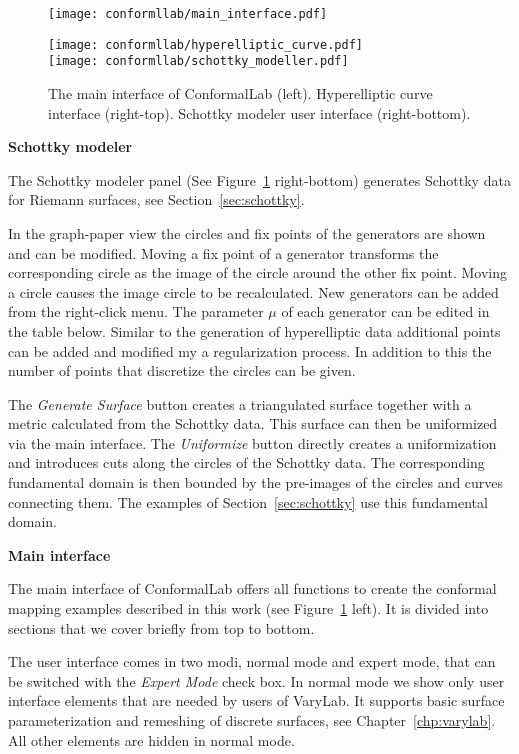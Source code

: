 \documentclass[Thesis.tex]{subfiles}
\begin{document}
\begin{figure}
\centering
\texttt{[image: conformllab/main\_interface.pdf]}\hfill
\begin{minipage}[b]{0.5\linewidth}
\texttt{[image: conformllab/hyperelliptic\_curve.pdf]}\\
\vskip 0.1cm
\texttt{[image: conformllab/schottky\_modeller.pdf]}
\end{minipage}
\caption{The main interface of {\sc ConformalLab} (left). Hyperelliptic curve interface (right-top).
Schottky modeler user interface (right-bottom).}
\label{fig:conformal_main_generators}
\end{figure}

{\bf Schottky modeler}

The Schottky modeler panel (See Figure~\ref{fig:conformal_main_generators} right-bottom) generates Schottky data for Riemann surfaces, see Section~\ref{sec:schottky}. 

In the graph-paper view the circles and fix points of the generators are shown and can be modified. 
Moving a fix point of a generator transforms the corresponding circle as the image of the circle around the other fix point. 
Moving a circle causes the image circle to be recalculated. 
New generators can be added from the right-click menu. 
The parameter $\mu$ of each generator can be edited in the table below.
Similar to the generation of hyperelliptic data additional points can be added and modified my a regularization process. 
In addition to this the number of points that discretize the circles can be given.

The \emph{Generate Surface} button creates a triangulated surface together with a metric calculated from the Schottky data. 
This surface can then be uniformized via the main interface. 
The \emph{Uniformize} button directly creates a uniformization and introduces cuts along the circles of the Schottky data. 
The corresponding fundamental domain is then bounded by the pre-images of the circles and curves connecting them.
The examples of Section~\ref{sec:schottky} use this fundamental domain.

{\bf Main interface}

The main interface of {\sc ConformalLab} offers all functions to create the conformal mapping examples described in this work (see Figure~\ref{fig:conformal_main_generators} left). 
It is divided into sections that we cover briefly from top to bottom. 

The user interface comes in two modi, normal mode and expert mode, that can be switched with the \emph{Expert Mode} check box. 
In normal mode we show only user interface elements that are needed by users of {\sc VaryLab}.
It supports basic surface parameterization and remeshing of discrete surfaces, see Chapter~\ref{chp:varylab}. 
All other elements are hidden in normal mode.
\end{document}
